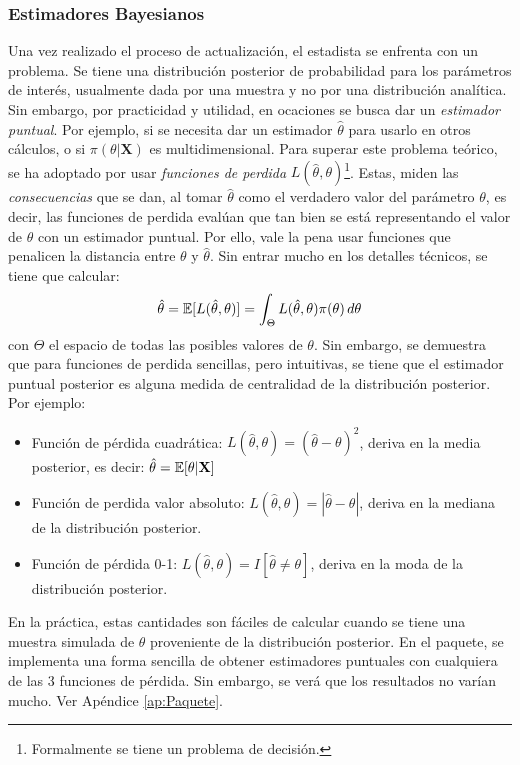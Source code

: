 \documentclass[../Main/Main.tex]{subfiles}
\begin{document}
\subsubsection{Estimadores Bayesianos}
Una vez realizado el proceso de actualización, el estadista se enfrenta con un problema. Se tiene una distribución posterior de probabilidad para los parámetros de interés, usualmente dada por una muestra y no por una distribución analítica. Sin embargo, por practicidad y utilidad, en ocaciones se busca dar un \textit{estimador puntual}. Por ejemplo, si se necesita dar un estimador $\hat \theta$ para usarlo en otros cálculos, o si $\pi(\theta|\mathbf{X})$ es multidimensional. Para superar este problema teórico, se ha adoptado por usar \textit{funciones de perdida} $L(\hat{\theta},\theta)$\footnote{Formalmente se tiene un problema de decisión.}. Estas, miden las \textit{consecuencias} que se dan, al tomar $\hat{\theta}$ como el verdadero valor del parámetro $\theta$, es decir, las funciones de perdida evalúan que tan bien se está representando el valor de $\theta$ con un estimador puntual. Por ello, vale la pena usar funciones que penalicen la distancia entre $\theta$ y $\hat{\theta}$. Sin entrar mucho en los detalles técnicos, se tiene que calcular: 
\begin{align}
\hat{\theta} = \mathbb{E}[L(\hat{\theta},\theta)] = \int_\Theta L(\hat{\theta},\theta) \pi(\theta)\, d\theta
\end{align}
con $\Theta$ el espacio de todas las posibles valores de $\theta$. Sin embargo, se demuestra que para funciones de perdida sencillas, pero intuitivas, se tiene que el estimador puntual posterior es alguna medida de centralidad de la distribución posterior. Por ejemplo:
\begin{itemize}
	\item Función de pérdida cuadrática: $L(\hat{\theta},\theta) = (\hat{\theta}-\theta)^2$, deriva en la media posterior, es decir: $\hat{\theta} = \mathbb{E}[\theta|\mathbf{X}]$ 
	\item Función de perdida valor absoluto: $L(\hat{\theta},\theta) = |\hat{\theta}-\theta|$, deriva en la mediana de la distribución posterior.
	\item Función de pérdida 0-1:  $L(\hat{\theta},\theta) = I[\hat{\theta} \neq \theta]$, deriva en la moda de la distribución posterior. 
\end{itemize}

En la práctica, estas cantidades son fáciles de calcular cuando se tiene una muestra simulada de $\theta$ proveniente de la distribución posterior. En el paquete, se implementa una forma sencilla de obtener estimadores puntuales con cualquiera de las 3 funciones de pérdida. Sin embargo, se verá que los resultados no varían mucho. Ver Apéndice \ref{ap:Paquete}.
\end{document}

